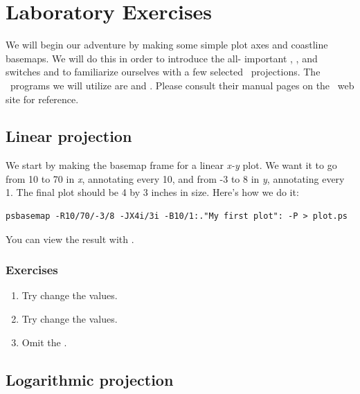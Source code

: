 \documentclass{report}
\begin{document}
\section{Laboratory Exercises}

We will begin our adventure by making some simple plot axes and
coastline basemaps.  We will do this in order to introduce the all-%
important , , and  switches and to familiarize
ourselves with a few selected \GMT\ projections.  The \GMT\ programs
we will utilize are  and .  Please
consult their manual pages on the \GMT\ web site for reference.

\subsection{Linear projection}

We start by making the basemap frame for a linear {\it x-y} plot.
We want it to go from 10 to 70 in {\it x}, annotating every 10, and
from -3 to 8 in {\it y}, annotating every 1.  The final plot should be
4 by 3 inches in size.  Here's how we do it:

{\small\begin{verbatim}
psbasemap -R10/70/-3/8 -JX4i/3i -B10/1:."My first plot": -P > plot.ps
\end{verbatim}
}

\noindent
You can view the result with  .

\subsubsection{Exercises}

\begin{enumerate}

\item Try change the  values.

\item Try change the  values.

\item Omit the .

\end{enumerate}

\subsection{Logarithmic projection}
\end{document}
